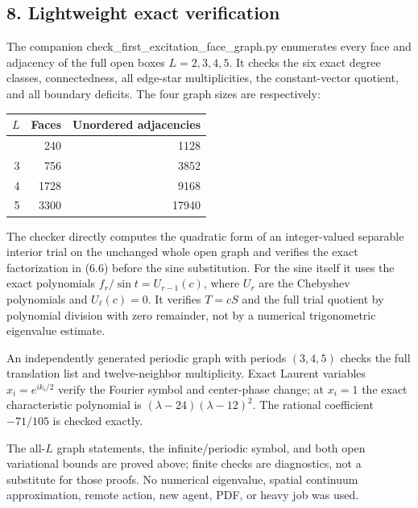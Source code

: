 \documentclass[
  11pt,
]{article}
\begin{document}
\subsection{8. Lightweight exact
verification}\label{magnetic-part-6-lightweight-exact-verification}

The companion check\_first\_excitation\_face\_graph.py enumerates every
face and adjacency of the full open boxes \(L=2,3,4,5\). It checks the
six exact degree classes, connectedness, all edge-star multiplicities,
the constant-vector quotient, and all boundary deficits. The four graph
sizes are respectively:

{\def\LTcaptype{none} %
\begin{longtable}[]{@{}rrr@{}}
\toprule\noalign{}
\(L\) & Faces & Unordered adjacencies \\
\midrule\noalign{}
\endhead
\bottomrule\noalign{}
\endlastfoot
2 & 240 & 1128 \\
3 & 756 & 3852 \\
4 & 1728 & 9168 \\
5 & 3300 & 17940 \\
\end{longtable}
}

The checker directly computes the quadratic form of an integer-valued
separable interior trial on the unchanged whole open graph and verifies
the exact factorization in (6.6) before the sine substitution. For the
sine itself it uses the exact polynomials \(f_r/\sin t=U_{r-1}(c)\),
where \(U_r\) are the Chebyshev polynomials and \(U_\ell(c)=0\). It
verifies \(T=cS\) and the full trial quotient by polynomial division
with zero remainder, not by a numerical trigonometric eigenvalue
estimate.

An independently generated periodic graph with periods \((3,4,5)\)
checks the full translation list and twelve-neighbor multiplicity. Exact
Laurent variables \(x_i=e^{ik_i/2}\) verify the Fourier symbol and
center-phase change; at \(x_i=1\) the exact characteristic polynomial is
\((\lambda-24)(\lambda-12)^2\). The rational coefficient \(-71/105\) is
checked exactly.

The all-\(L\) graph statements, the infinite/periodic symbol, and both
open variational bounds are proved above; finite checks are diagnostics,
not a substitute for those proofs. No numerical eigenvalue, spatial
continuum approximation, remote action, new agent, PDF, or heavy job was
used.

\clearpage
\end{document}
